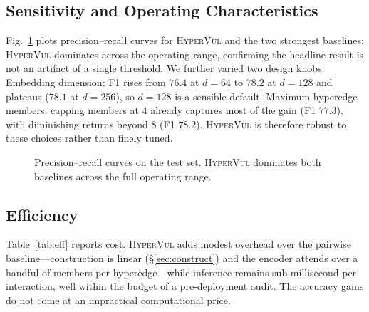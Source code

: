 \documentclass[conference]{IEEEtran}
\newcommand{\hypervul}{\textsc{HyperVul}}
\begin{document}
\subsection{Sensitivity and Operating Characteristics}
Fig.~\ref{fig:pr} plots precision--recall curves for \hypervul{} and the two strongest
baselines; \hypervul{} dominates across the operating range, confirming the headline
result is not an artifact of a single threshold. We further varied two design knobs.
Embedding dimension: F1 rises from $76.4$ at $d{=}64$ to $78.2$ at $d{=}128$ and
plateaus ($78.1$ at $d{=}256$), so $d{=}128$ is a sensible default. Maximum hyperedge
members: capping members at $4$ already captures most of the gain (F1 $77.3$), with
diminishing returns beyond $8$ (F1 $78.2$). \hypervul{} is therefore robust to these
choices rather than finely tuned.

\begin{figure}[t]
\centering
{}
\caption{Precision--recall curves on the test set. \hypervul{} dominates both
baselines across the full operating range.}
\label{fig:pr}
\end{figure}

\subsection{Efficiency}
Table~\ref{tab:eff} reports cost. \hypervul{} adds modest overhead over the pairwise
baseline---construction is linear (\S\ref{sec:construct}) and the encoder attends over
a handful of members per hyperedge---while inference remains sub-millisecond per
interaction, well within the budget of a pre-deployment audit. The accuracy gains do
not come at an impractical computational price.
\end{document}

